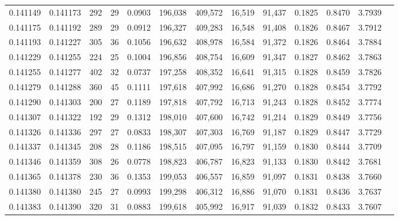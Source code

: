 \begin{tabular}{rrrrrrrrrrrrr}
0.141149 & 0.141173 &   292 &  29 &                                     0.0903 & 196,038 & 409,572 &  16,519 &  91,437 & 0.1825 & 0.8470 & 3.7939 \\
0.141175 & 0.141192 &   289 &  29 &                                     0.0912 & 196,327 & 409,283 &  16,548 &  91,408 & 0.1826 & 0.8467 & 3.7912 \\
0.141193 & 0.141227 &   305 &  36 &                                     0.1056 & 196,632 & 408,978 &  16,584 &  91,372 & 0.1826 & 0.8464 & 3.7884 \\
0.141229 & 0.141255 &   224 &  25 &                                     0.1004 & 196,856 & 408,754 &  16,609 &  91,347 & 0.1827 & 0.8462 & 3.7863 \\
0.141255 & 0.141277 &   402 &  32 &                                     0.0737 & 197,258 & 408,352 &  16,641 &  91,315 & 0.1828 & 0.8459 & 3.7826 \\
0.141279 & 0.141288 &   360 &  45 &                                     0.1111 & 197,618 & 407,992 &  16,686 &  91,270 & 0.1828 & 0.8454 & 3.7792 \\
0.141290 & 0.141303 &   200 &  27 &                                     0.1189 & 197,818 & 407,792 &  16,713 &  91,243 & 0.1828 & 0.8452 & 3.7774 \\
0.141307 & 0.141322 &   192 &  29 &                                     0.1312 & 198,010 & 407,600 &  16,742 &  91,214 & 0.1829 & 0.8449 & 3.7756 \\
0.141326 & 0.141336 &   297 &  27 &                                     0.0833 & 198,307 & 407,303 &  16,769 &  91,187 & 0.1829 & 0.8447 & 3.7729 \\
0.141337 & 0.141345 &   208 &  28 &                                     0.1186 & 198,515 & 407,095 &  16,797 &  91,159 & 0.1830 & 0.8444 & 3.7709 \\
0.141346 & 0.141359 &   308 &  26 &                                     0.0778 & 198,823 & 406,787 &  16,823 &  91,133 & 0.1830 & 0.8442 & 3.7681 \\
0.141365 & 0.141378 &   230 &  36 &                                     0.1353 & 199,053 & 406,557 &  16,859 &  91,097 & 0.1831 & 0.8438 & 3.7660 \\
0.141380 & 0.141380 &   245 &  27 &                                     0.0993 & 199,298 & 406,312 &  16,886 &  91,070 & 0.1831 & 0.8436 & 3.7637 \\
0.141383 & 0.141390 &   320 &  31 &                                     0.0883 & 199,618 & 405,992 &  16,917 &  91,039 & 0.1832 & 0.8433 & 3.7607 \\

\end{tabular}
